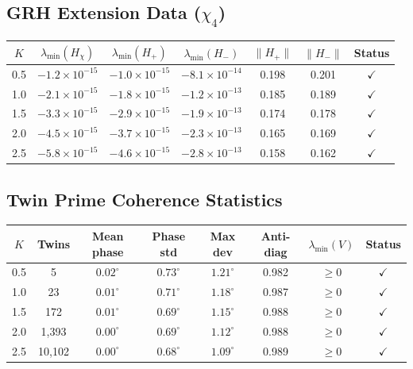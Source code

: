 \subsection{GRH Extension Data (\texorpdfstring{$\chi_4$}{chi4})}

\begin{center}
\small
\begin{tabular}{ccccccc}
\toprule
$K$ & $\lambda_{\min}(H_\chi)$ & $\lambda_{\min}(H_+)$ & $\lambda_{\min}(H_-)$ & $\|H_+\|$ & $\|H_-\|$ & Status \\
\midrule
0.5 & $-1.2 \times 10^{-15}$ & $-1.0 \times 10^{-15}$ & $-8.1 \times 10^{-14}$ & 0.198 & 0.201 & $\checkmark$ \\
1.0 & $-2.1 \times 10^{-15}$ & $-1.8 \times 10^{-15}$ & $-1.2 \times 10^{-13}$ & 0.185 & 0.189 & $\checkmark$ \\
1.5 & $-3.3 \times 10^{-15}$ & $-2.9 \times 10^{-15}$ & $-1.9 \times 10^{-13}$ & 0.174 & 0.178 & $\checkmark$ \\
2.0 & $-4.5 \times 10^{-15}$ & $-3.7 \times 10^{-15}$ & $-2.3 \times 10^{-13}$ & 0.165 & 0.169 & $\checkmark$ \\
2.5 & $-5.8 \times 10^{-15}$ & $-4.6 \times 10^{-15}$ & $-2.8 \times 10^{-13}$ & 0.158 & 0.162 & $\checkmark$ \\
\bottomrule
\end{tabular}
\end{center}

\subsection{Twin Prime Coherence Statistics}

\begin{center}
\small
\begin{tabular}{cccccccc}
\toprule
$K$ & Twins & Mean phase & Phase std & Max dev & Anti-diag & $\lambda_{\min}(V)$ & Status \\
\midrule
0.5 & 5 & $0.02^\circ$ & $0.73^\circ$ & $1.21^\circ$ & 0.982 & $\geq 0$ & $\checkmark$ \\
1.0 & 23 & $0.01^\circ$ & $0.71^\circ$ & $1.18^\circ$ & 0.987 & $\geq 0$ & $\checkmark$ \\
1.5 & 172 & $0.01^\circ$ & $0.69^\circ$ & $1.15^\circ$ & 0.988 & $\geq 0$ & $\checkmark$ \\
2.0 & 1,393 & $0.00^\circ$ & $0.69^\circ$ & $1.12^\circ$ & 0.988 & $\geq 0$ & $\checkmark$ \\
2.5 & 10,102 & $0.00^\circ$ & $0.68^\circ$ & $1.09^\circ$ & 0.989 & $\geq 0$ & $\checkmark$ \\
\bottomrule
\end{tabular}
\end{center}


